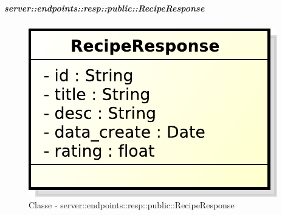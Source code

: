     \subparagraph{server::endpoints::resp::public::RecipeResponse} %
    \label{subp:bdsm_app_server_endpoints_resp_private_reciperesponse}
  \begin{figure}[!htbp]
    \centering
    \centerline{\includegraphics[scale=0.6]{./images/server/classes/endpoints/recipe_response.pdf}}
    \caption{Classe - server::endpoints::resp::public::RecipeResponse}
  \end{figure}
